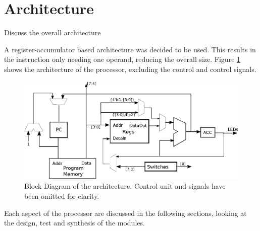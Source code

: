 
\section{Architecture}

Discuss the overall architecture

A register-accumulator based architecture was decided to be used. 
This results in the instruction only needing one operand, reducing the overall size. 
Figure \ref{fig:arch} shows the architecture of the processor, excluding the control and control signals.

\begin{figure}
\includegraphics[width=\textwidth]{Figures/architecture.eps}
\caption{Block Diagram of the architecture. Control unit and signals have been omitted for clarity.}
\label{fig:arch}
\end{figure}

Each aspect of the processor are discussed in the following sections, looking at the design, test and synthesis of the modules.

